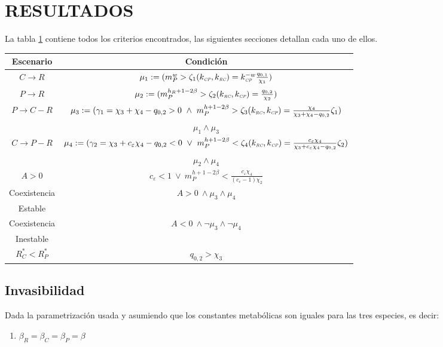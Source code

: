 \section{RESULTADOS}
La tabla \ref{tab:resultados} contiene todos los criterios encontrados, las siguientes secciones detallan cada uno de ellos.
\begin{table}
  \caption{Condiciones encontradas para los distintos escenarios explorados, en base a relaciones entre $m_\PP, k_\RC$ y $k_\CP$. Detalles de cada uno de ellos se dan en las secciones siguientes.}
\begin{longtable}{|c|c|}
  \hline
  Escenario & Condici\'on \\ \hline
  $C \to R$ & $\mu_1 := (m_P^w > \zeta_1(k_{\textit{\tiny CP}},k_{\textit{\tiny RC}}) = k_{\textit{\tiny CP}}^{-w}\frac{q_{0,1}}{\chi_1})$ \\ \hline
  $P \to R$ & $\mu_2 := (m_P^{h_R + 1 - 2\beta} > \zeta_2(k_{\textit{\tiny RC}},k_{\textit{\tiny CP}}) = \frac{q_{0,2}}{\chi_2})$ \\ \hline
  $P \to C-R$ & $\mu_3 := (\gamma_1 = \chi_3 + \chi_4 - q_{0,2} >0 \ \land \ m_P^{h + 1 - 2\beta} > \zeta_3(k_{\textit{\tiny RC}},k_{\textit{\tiny CP}}) = \frac{\chi_4}{\chi_3 + \chi_4 - q_{0,2}}\zeta_1)$ \\ 
& $\mu_1 \land \mu_3$ \\\hline
  $C \to P-R$ &$\mu_4 := (\gamma_2 = \chi_3 + c_\varepsilon \chi_4 - q_{0,2} < 0 \ \lor \  m_P^{h + 1 - 2\beta} < \zeta_4(k_{\textit{\tiny RC}},k_{\textit{\tiny CP}}) = \frac{c_\varepsilon \chi_4}{\chi_3 + c_\varepsilon \chi_4 - q_{0,2}} \zeta_2 )$ \\ 
 & $\mu_2 \land \mu_4$ \\ \hline
  $ A > 0$ & $c_\varepsilon < 1 \  \lor \  m_P^{h + 1 - 2\beta} < \frac{c_\varepsilon \chi_4}{(c_\varepsilon - 1) \chi_2}$ \\ \hline
  Coexistencia & $A > 0  \ \land  \mu_3 \land \mu_4$ \\ 
  Estable & \\ \hline
  Coexistencia & $A < 0 \ \land \neg\mu_3 \land \neg \mu_4$\\
  Inestable & \\ \hline
  $R^*_C < R^*_P$ & $q_{0,2} > \chi_3$ \\\hline
\end{longtable}
\label{tab:resultados}
\end{table}
\subsection{Invasibilidad}
Dada la parametrizaci\'on usada y asumiendo que los constantes metab\'olicas son iguales para las tres especies, es decir:
\begin{enumerate}
\item $\beta_R = \beta_C = \beta_P = \beta$
\end{enumerate}

